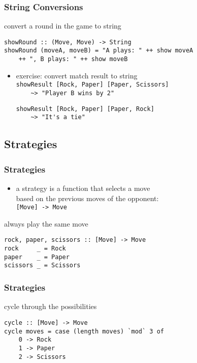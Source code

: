 \documentclass[dvipsnames]{beamer}
\theoremstyle{plain}
\begin{document}
\begin{frame}[fragile]
  \frametitle{String Conversions}

  \begin{exampleblock}{convert a round in the game to string}
    \begin{lstlisting}
showRound :: (Move, Move) -> String
showRound (moveA, moveB) = "A plays: " ++ show moveA
    ++ ", B plays: " ++ show moveB
    \end{lstlisting}
  \end{exampleblock}

  \pause
  \vspace{-12pt}
  \begin{itemize}
    \item exercise: convert match result to string\\
      \lstinline|showResult [Rock, Paper] [Paper, Scissors]|\\
      \lstinline|    ~> "Player B wins by 2"|

      \smallskip
      \lstinline|showResult [Rock, Paper] [Paper, Rock]|\\
      \lstinline|    ~> "It's a tie"|
  \end{itemize}
\end{frame}

\subsection{Strategies}

\begin{frame}[fragile]
  \frametitle{Strategies}

  \begin{itemize}
    \item a strategy is a function that selects a move\\
      based on the previous moves of the opponent:\\
      \lstinline|[Move] -> Move|
  \end{itemize}

  \begin{exampleblock}{always play the same move}
    \begin{lstlisting}
rock, paper, scissors :: [Move] -> Move
rock     _ = Rock
paper    _ = Paper
scissors _ = Scissors
    \end{lstlisting}
  \end{exampleblock}
\end{frame}

\begin{frame}[fragile]
  \frametitle{Strategies}

  \begin{exampleblock}{cycle through the possibilities}
    \begin{lstlisting}[deletekeywords={cycle}]
cycle :: [Move] -> Move
cycle moves = case (length moves) `mod` 3 of
    0 -> Rock
    1 -> Paper
    2 -> Scissors
    \end{lstlisting}
  \end{exampleblock}
\end{frame}
\end{document}
